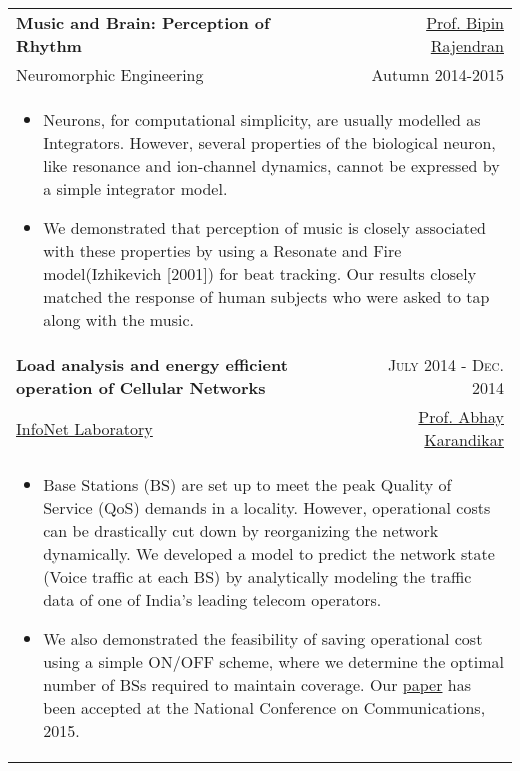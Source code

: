 \begin{tabularx}{0.95\textwidth}{lr}
\textbf{Music and Brain: Perception of Rhythm} &
\href{https://www.ee.iitb.ac.in/web/faculty/homepage/bipin}{Prof. Bipin
Rajendran} \\
Neuromorphic Engineering & Autumn 2014-2015 \\
\multicolumn{2}{p{16cm}}{
\begin{itemize}
        \item Neurons, for computational simplicity, are usually modelled as
Integrators. However, several properties of the biological neuron, like
resonance and ion-channel dynamics, cannot be expressed by a simple integrator
model.
        \item We demonstrated that perception of music is closely associated
with these properties by using a Resonate and Fire model(Izhikevich [2001]) for
beat tracking. Our results closely matched the response of human subjects who
were asked to tap along with the music.
\end{itemize}
}\\

\textbf{Load analysis and energy efficient operation of  Cellular Networks} &
\textsc{July 2014 - Dec. 2014}\\
\href{https://www.ee.iitb.ac.in/~infonet/}{InfoNet Laboratory} & \href{https://www.ee.iitb.ac.in/wiki/faculty/karandi}{Prof. Abhay Karandikar}\\
\multicolumn{2}{p{16cm}}{
\begin{itemize}
	\item Base Stations (BS) are set up to meet the peak Quality of Service
(QoS) demands in a locality. However, operational costs can be drastically cut
down by reorganizing the network dynamically. We developed a model to predict
the network state (Voice traffic at each BS) by analytically modeling the traffic 
data of one of India's leading telecom operators. 
	\item We also demonstrated the feasibility of saving operational cost
using a simple ON/OFF scheme, where we determine the optimal number of BSs
required to maintain coverage. Our \href{http://www.ee.iitb.ac.in/student/~architgupta93/projects/desc/btp-paper.htm}{paper} has been accepted at  the National Conference on Communications, 2015.
\end{itemize}
}\\
 


\end{tabularx}
